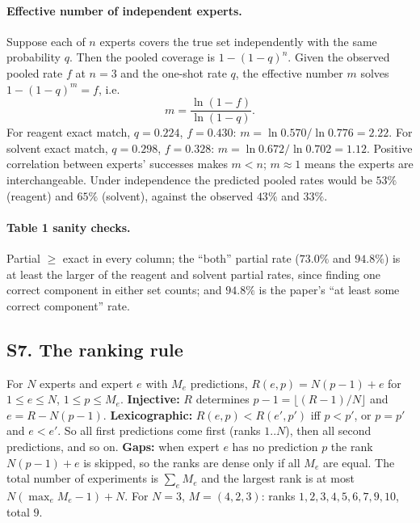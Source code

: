 \documentclass[11pt]{article}
\begin{document}
\paragraph{Effective number of independent experts.} Suppose each of $n$ experts covers the true set independently with the same probability $q$. Then the pooled coverage is $1-(1-q)^n$. Given the observed pooled rate $f$ at $n=3$ and the one-shot rate $q$, the effective number $m$ solves $1-(1-q)^m=f$, i.e.
\[
  m=\frac{\ln(1-f)}{\ln(1-q)}.
\]
For reagent exact match, $q=0.224$, $f=0.430$: $m=\ln0.570/\ln0.776=2.22$. For solvent exact match, $q=0.298$, $f=0.328$: $m=\ln0.672/\ln0.702=1.12$. Positive correlation between experts' successes makes $m<n$; $m\approx1$ means the experts are interchangeable. Under independence the predicted pooled rates would be $53\%$ (reagent) and $65\%$ (solvent), against the observed $43\%$ and $33\%$.

\paragraph{Table 1 sanity checks.} Partial $\ge$ exact in every column; the ``both'' partial rate ($73.0\%$ and $94.8\%$) is at least the larger of the reagent and solvent partial rates, since finding one correct component in either set counts; and $94.8\%$ is the paper's ``at least some correct component'' rate.

\label{sec:S7}
\subsection*{S7. The ranking rule}
For $N$ experts and expert $e$ with $M_e$ predictions, $R(e,p)=N(p-1)+e$ for $1\le e\le N$, $1\le p\le M_e$. \textbf{Injective:} $R$ determines $p-1=\lfloor(R-1)/N\rfloor$ and $e=R-N(p-1)$. \textbf{Lexicographic:} $R(e,p)<R(e',p')$ iff $p<p'$, or $p=p'$ and $e<e'$. So all first predictions come first (ranks $1..N$), then all second predictions, and so on. \textbf{Gaps:} when expert $e$ has no prediction $p$ the rank $N(p-1)+e$ is skipped, so the ranks are dense only if all $M_e$ are equal. The total number of experiments is $\sum_eM_e$ and the largest rank is at most $N(\max_eM_e-1)+N$. For $N=3$, $M=(4,2,3)$: ranks $1,2,3,4,5,6,7,9,10$, total $9$.

\label{sec:S8}
\end{document}
